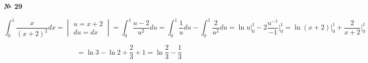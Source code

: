 \documentclass{article}
\begin{document}
\textbf{№ 29} 


$$ \int_{0}^{1} \frac{x}{(x+2)^2} dx 
= \begin{vmatrix} u = x+2 \\ 
                 du = dx \end{vmatrix} 
= \int_{0}^{1} \frac{u-2}{u^2} du 
= \int_{0}^{1} \frac{1}{u}du - \int_{0}^{1} \frac{2}{u^2}du
= \ln{u} \bigg\vert_{0}^{1} - 2 \frac{u^{-1}}{-1} \bigg\vert_{0}^{1} 
= \ln{(x+2)} \bigg\vert_{0}^{1} + \frac{2}{x+2} \bigg\vert_{0}^{1} 
= $$

$$ = \ln{3} - \ln{2} + \frac{2}{3} + 1 
= \ln{\frac{2}{3}} - \frac{1}{3} $$
\end{document}

